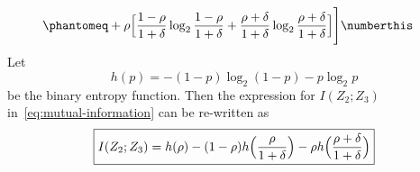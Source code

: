 \documentclass[
  coursecode={MTHE 474},
  assignmentname={Homework \homeworknumber},
  studentnumber=20053722,
  name={Bryan Hoang},
  draft,
]{
  ltxanswer%
}
\begin{document}
\begin{questions}
\begin{parts}
\begin{solution}
\begin{align*}
                         &\phantomeq + \rho\Bigl[\frac{1-\rho}{1+\delta}\log_{2}\frac{1-\rho}{1+\delta} + \frac{\rho+\delta}{1+\delta}\log_{2}\frac{\rho+\delta}{1+\delta}\Bigr]\Biggr]\numberthis\label{eq:mutual-information}
        \end{align*}
        Let
        \begin{equation}\label{eq:binary-entropy-function}
          h(p)=-(1-p)\log_{2}(1-p)-p\log_{2}p
        \end{equation}
        be the binary entropy function. Then the expression for \(I(Z_{2};Z_{3})\) in~\eqref{eq:mutual-information} can be re-written as
        \begin{equation*}
          \boxed{I(Z_{2};Z_{3}) = h(\rho)-(1-\rho)h\Bigl(\frac{\rho}{1+\delta}\Bigr)-\rho h\Bigl(\frac{\rho+\delta}{1+\delta}\Bigr)}
        \end{equation*}


\end{solution}
\end{parts}
\end{questions}
\end{document}
